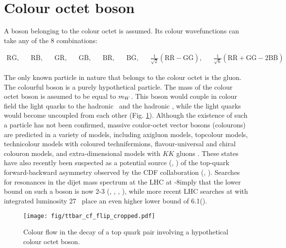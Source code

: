 \section{Colour octet \PW boson}

A \PW boson belonging to the colour octet is assumed. Its colour wavefunctions can take any of the 8 combinations:

\begin{align}
\text{R}\overline{\text{G}}, && \text{R}\overline{\text{B}}, && \text{G}\overline{\text{R}}, && \text{G}\overline{\text{B}}, && \text{B}\overline{\text{R}}, && \text{B}\overline{\text{G}}, && \frac{1}{\sqrt{2}}\left(\text{R}\overline{\text{R}}-\text{G}\overline{\text{G}}\right), && \frac{1}{\sqrt{6}}\left(\text{R}\overline{\text{R}}+\text{G}\overline{\text{G}}-2\text{B}\overline{\text{B}}\right)
\end{align}

The only known particle in nature that belongs to the colour octet is the gluon. The colourful \PW boson is a purely hypothetical particle. The mass of the colour octet \PW boson is assumed to be equal to $m_{W}$. This boson would couple in colour field the light quarks to the hadronic \cPqb\ and the hadronic \cPqt, while the light quarks would become uncoupled from each other (Fig. \ref{fig:ttbar_cf_octet}).
Although the existence of such a particle has not been confirmed, massive coulor-octet vector bosons (colourons) are predicted in a variety of models, including axigluon models, topcolour models, technicolour models with coloured technifermions, flavour-universal and chiral colouron models, and extra-dimensional models with $KK$ gluons \cite{Chivukula:2013xla}.  These states have also recently been suspected as a potential source (\cite{Ferrario:2009bz}, \cite{Frampton:2009rk}) of the top-quark forward-backward asymmetry observed by the CDF collaboration (\cite{Aaltonen:2008hc}, \cite{Aaltonen:2011kc}). Searches for resonances in the dijet mass spectrum at the LHC at -8\TeV imply that the lower bound on such a boson is now 2-3 \TeV (\cite{Han:2010rf}, \cite{Haisch:2011up}, \cite{Chatrchyan:2011ns}, \cite{Aad:2011fq}), while more recent LHC searches at \TeV with integrated luminosity 27 \fbinv\ place an even higher lower bound of 6.1\TeV (\cite{CMS:2017xrr}).
  
  \begin{figure}[h!]
  \centering
  \texttt{[image: fig/ttbar\_cf\_flip\_cropped.pdf]}
  \caption{Colour flow in the decay of a top quark pair involving a hypothetical colour octet \PW boson.}
  \label{fig:ttbar_cf_octet}
\end{figure}


